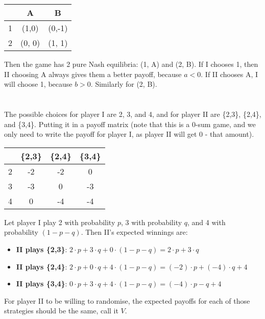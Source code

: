 \documentclass[11pt,journal]{article}
\begin{document}
		\begin{table}[h]
		\centering
		\begin{tabular}{c|c|c}
			& A & B \\
			\hline
			1 &(1,0) & (0,-1) \\
			\hline
			2 & (0, 0) & (1, 1) \\
		\end{tabular}
	\end{table}
	Then the game has 2 pure Nash equilibria: (1, A) and (2, B). If I chooses 1, then II choosing A always gives them a better payoff, because $a<0$. If II chooses A, I will choose 1, because $b>0$. Similarly for (2, B).

	
	\section{}
	The possible choices for player I are 2, 3, and 4, and for player II are \{2,3\}, \{2,4\}, and \{3,4\}. Putting it in a payoff matrix (note that this is a 0-sum game, and we only need to write the payoff for player I, as player II will get 0 - that amount).
	
			\begin{table}[h]
		\centering
		\begin{tabular}{c|c|c|c}
			& \{2,3\} & \{2,4\} & \{3,4\} \\
			\hline
			2 & -2 & -2 & 0 \\
			\hline
			3 & -3 & 0 & -3 \\
			\hline
			4 & 0 & -4 &  -4 \\
		\end{tabular}
	\end{table}

	Let player I play 2 with probability $p$, 3 with probability $q$, and 4 with probability $(1-p-q)$. Then II's expected winnings are:
	
	\begin{itemize}
		\item \textbf{II plays \{2,3\}}:  $2 \cdot p +3 \cdot q + 0 \cdot (1-p-q) = 2\cdot p + 3 \cdot q$
		\item \textbf{II plays \{2,4\}}:  $2 \cdot p +0 \cdot q + 4 \cdot (1-p-q) = (-2)\cdot p + (-4) \cdot q + 4$
		\item \textbf{II plays \{3,4\}}:  $0 \cdot p +3 \cdot q + 4 \cdot (1-p-q) = (-4) \cdot p -q + 4$
	\end{itemize}

	For player II to be willing to randomise, the expected payoffs for each of those strategies should be the same, call it $V$.
	
\end{document}
